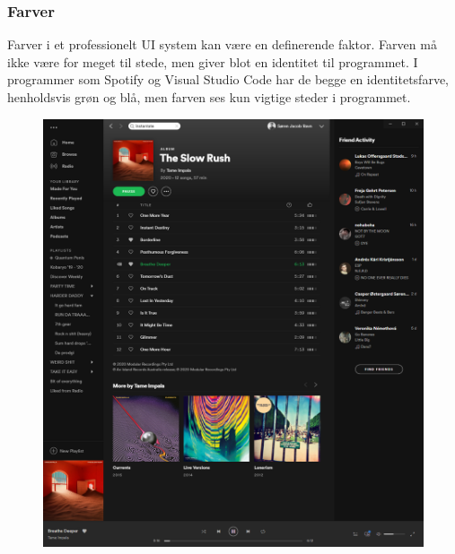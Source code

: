 \subsubsection{Farver}
Farver i et professionelt UI system kan være en definerende faktor. Farven må ikke være for meget til stede, men giver blot en identitet til programmet. I programmer som Spotify og Visual Studio Code har de begge en identitetsfarve, henholdsvis grøn og blå, men farven ses kun vigtige steder i programmet. 
\begin{figure}
    \centering
    \includegraphics[width=\textwidth]{figures/Preliminary/Spotify.png}
    \label{fig:spotify}
\end{figure}
